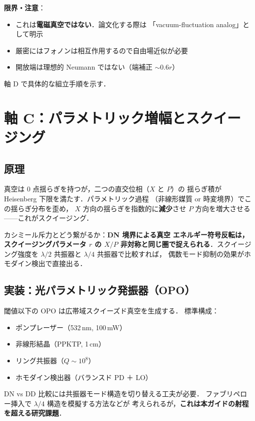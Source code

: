 \documentclass[11pt,a4paper]{article}
\begin{document}
\textbf{限界・注意}：
\begin{itemize}
\item これは\textbf{電磁真空ではない}．論文化する際は
「vacuum-fluctuation analog」として明示
\item 厳密にはフォノンは相互作用するので自由場近似が必要
\item 開放端は理想的 Neumann ではない（端補正 $\sim 0.6 r$）
\end{itemize}

軸 D で具体的な組立手順を示す．

\newpage
\section{軸 C：パラメトリック増幅とスクイージング}

\subsection{原理}

真空は 0 点揺らぎを持つが，二つの直交位相（$X$ と $P$）の
揺らぎ積が Heisenberg 下限を満たす．パラメトリック過程
（非線形媒質 or 時変境界）でこの揺らぎ分布を歪め，
$X$ 方向の揺らぎを指数的に\textbf{減少}させ $P$ 方向を増大させる
——これがスクイージング．

カシミール斥力とどう繋がるか：\textbf{DN 境界による真空
エネルギー符号反転は，スクイージングパラメータ
$r$ の $X/P$ 非対称と同じ圏で捉えられる}．スクイージング強度を
$\lambda/2$ 共振器と $\lambda/4$ 共振器で比較すれば，
偶数モード抑制の効果がホモダイン検出で直接出る．

\subsection{実装：光パラメトリック発振器（OPO）}

閾値以下の OPO は広帯域スクイーズド真空を生成する．
標準構成：
\begin{itemize}
\item ポンプレーザー（532\,nm, 100\,mW）
\item 非線形結晶（PPKTP, 1\,cm）
\item リング共振器（$Q\sim 10^8$）
\item ホモダイン検出器（バランスド PD ＋ LO）
\end{itemize}

DN vs DD 比較には共振器モード構造を切り替える工夫が必要．
ファブリペロー挿入で $\lambda/4$ 構造を模擬する方法などが
考えられるが，\textbf{これは本ガイドの射程を超える研究課題}．
\end{document}
